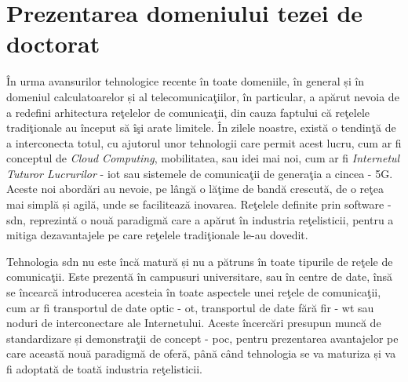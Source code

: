 \section{Prezentarea domeniului tezei de doctorat}

În urma avansurilor tehnologice recente în toate domeniile, în general și în domeniul calculatoarelor și al telecomunicaţiilor, în particular, a apărut nevoia de a redefini arhitectura reţelelor de comunicaţii, din cauza faptului că reţelele tradiţionale au început să îşi arate limitele. În zilele noastre, există o tendinţă de a interconecta totul, cu ajutorul unor tehnologii care permit acest lucru, cum ar fi conceptul de \textit{Cloud Computing}, mobilitatea, sau idei mai noi, cum ar fi \textit{Internetul Tuturor Lucrurilor} - \gls{iot} sau sistemele de comunicaţii de generaţia a cincea - 5G. Aceste noi abordări au nevoie, pe lângă o lăţime de bandă crescută, de o reţea mai simplă și agilă, unde se facilitează inovarea. Reţelele definite prin software - \gls{sdn}, reprezintă o nouă paradigmă care a apărut în industria reţelisticii, pentru a mitiga dezavantajele pe care reţelele tradiţionale le-au dovedit.

Tehnologia \gls{sdn} nu este încă matură și nu a pătruns în toate tipurile de reţele de comunicaţii. Este prezentă în campusuri universitare, sau în centre de date, însă se încearcă introducerea acesteia în toate aspectele unei reţele de comunicaţii, cum ar fi transportul de date optic - \gls{ot}, transportul de date fără fir - \gls{wt} sau noduri de interconectare ale Internetului. Aceste încercări presupun muncă de standardizare și demonstraţii de concept - \gls{poc}, pentru prezentarea avantajelor pe care această nouă paradigmă de oferă, până când tehnologia se va maturiza și va fi adoptată de toată industria reţelisticii.